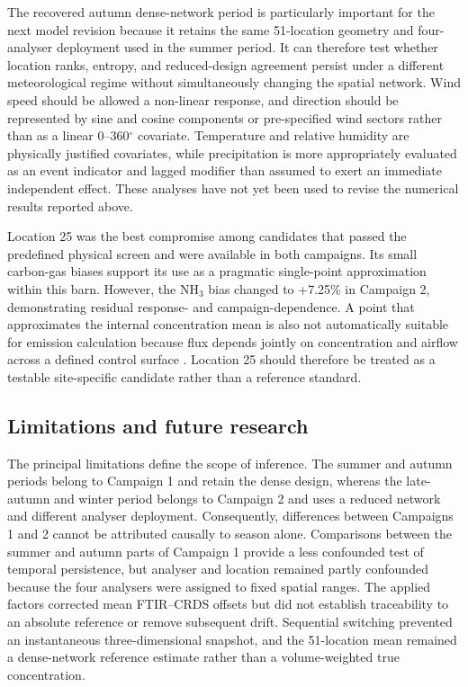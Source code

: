 \documentclass[12pt,a4paper]{article}
\begin{document}
The recovered autumn dense-network period is particularly important for the
next model revision because it retains the same 51-location geometry and
four-analyser deployment used in the summer period. It can therefore test
whether location ranks, entropy, and reduced-design agreement persist under a
different meteorological regime without simultaneously changing the spatial
network. Wind speed should be allowed a non-linear response, and direction
should be represented by sine and cosine components or pre-specified wind
sectors rather than as a linear 0--360\(^\circ\) covariate. Temperature and
relative humidity are physically justified covariates, while precipitation is
more appropriately evaluated as an event indicator and lagged modifier than
assumed to exert an immediate independent effect. These analyses have not yet
been used to revise the numerical results reported above.

Location 25 was the best compromise among candidates that passed the
predefined physical screen and were available in both campaigns. Its small
carbon-gas biases support its use as a pragmatic single-point approximation
within this barn. However, the \(\mathrm{NH_3}\) bias changed to +7.25\% in
Campaign 2, demonstrating residual response- and campaign-dependence. A point
that approximates the internal concentration mean is also not automatically
suitable for emission calculation because flux depends jointly on
concentration and airflow across a defined control surface
\citep{Calvet2013,Ogink2013}. Location 25 should therefore be treated as a
testable site-specific candidate rather than a reference standard.

\subsection{Limitations and future research}

The principal limitations define the scope of inference. The summer and
autumn periods belong to Campaign 1 and retain the dense design, whereas the
late-autumn and winter period belongs to Campaign 2 and uses a reduced network
and different analyser deployment. Consequently, differences between
Campaigns 1 and 2 cannot be attributed causally to season alone. Comparisons
between the summer and autumn parts of Campaign 1 provide a less confounded
test of temporal persistence, but analyser and location remained partly
confounded because the four analysers were assigned to fixed spatial ranges.
The applied factors corrected mean FTIR--CRDS offsets but did not establish
traceability to an absolute reference or remove subsequent drift. Sequential
switching prevented an instantaneous three-dimensional snapshot, and the
51-location mean remained a dense-network reference estimate rather than a
volume-weighted true concentration.
\end{document}
